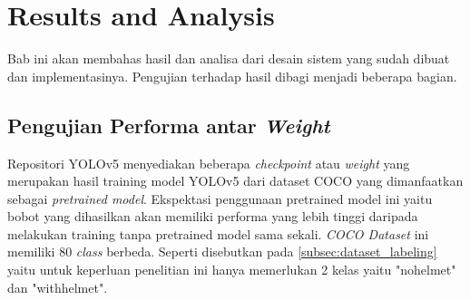\section{Results and Analysis}
\label{sec:resultnanalysis}

\par Bab ini akan membahas hasil dan analisa dari desain sistem yang sudah dibuat dan implementasinya. Pengujian terhadap hasil dibagi menjadi beberapa bagian.

\subsection{Pengujian Performa antar \emph{Weight}}
\label{subsec:modeltest}


\par Repositori YOLOv5 menyediakan beberapa \emph{checkpoint} atau \emph{weight} yang merupakan hasil training model YOLOv5 dari dataset COCO yang dimanfaatkan sebagai \emph{pretrained model}. Ekspektasi penggunaan pretrained model ini yaitu bobot yang dihasilkan akan memiliki performa yang lebih tinggi daripada melakukan training tanpa pretrained model sama sekali. \emph{COCO Dataset} ini memiliki 80 \emph{class} berbeda. Seperti disebutkan pada \ref{subsec:dataset_labeling} yaitu untuk keperluan penelitian ini hanya memerlukan 2 kelas yaitu "no\textunderscore helmet" dan "with\textunderscore helmet".


